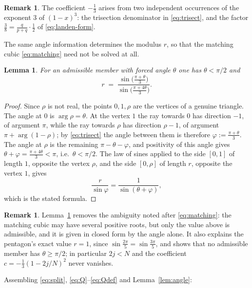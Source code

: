 \documentclass[11pt]{article}
\newtheorem{lemma}[theorem]{Lemma}
\theoremstyle{definition}
\newtheorem{remark}[theorem]{Remark}
\begin{document}
\begin{remark}
The coefficient $-\tfrac13$ arises from two independent occurrences of the exponent $3$ of $(1-x)^3$:
the trisection denominator in \eqref{eq:trisect}, and the factor
$\tfrac38=\tfrac{q}{p+q}\cdot\tfrac12$ of \eqref{eq:landen-form}.
\end{remark}

The same angle information determines the modulus $r$, so that the matching cubic
\eqref{eq:matching} need not be solved at all.

\begin{lemma}\label{lem:modulus}
For an admissible member with forced angle $\theta$ one has $\theta<\pi/2$ and
\[
  r\;=\;\frac{\sin\!\big(\tfrac{\pi+\theta}{3}\big)}{\sin\!\big(\tfrac{\pi+4\theta}{3}\big)} .
\]
\end{lemma}

\begin{proof}
Since $\rho$ is not real, the points $0,1,\rho$ are the vertices of a genuine triangle. The angle at
$0$ is $\arg\rho=\theta$. At the vertex $1$ the ray towards $0$ has direction $-1$, of argument $\pi$,
while the ray towards $\rho$ has direction $\rho-1$, of argument $\pi+\arg(1-\rho)$; by
\eqref{eq:trisect} the angle between them is therefore $\varphi:=\tfrac{\pi+\theta}{3}$. The angle at
$\rho$ is the remaining $\pi-\theta-\varphi$, and positivity of this angle gives
$\theta+\varphi=\tfrac{\pi+4\theta}{3}<\pi$, i.e.\ $\theta<\pi/2$. The law of sines applied to the
side $[0,1]$ of length $1$, opposite the vertex $\rho$, and the side $[0,\rho]$ of length $r$,
opposite the vertex $1$, gives
\[
  \frac{r}{\sin\varphi}=\frac{1}{\sin(\theta+\varphi)},
\]
which is the stated formula. \qedhere
\end{proof}

\begin{remark}
Lemma~\ref{lem:modulus} removes the ambiguity noted after \eqref{eq:matching}: the matching cubic may
have several positive roots, but only the value above is admissible, and it is given in closed form
by the angle alone. It also explains the pentagon's exact value $r=1$, since
$\sin\tfrac{2\pi}{5}=\sin\tfrac{3\pi}{5}$, and shows that no admissible member has $\theta\ge\pi/2$;
in particular $2j<N$ and the coefficient $c=-\tfrac13(1-2j/N)^2$ never vanishes.
\end{remark}

Assembling \eqref{eq:split}, \eqref{eq:Q}--\eqref{eq:Qdef} and Lemma~\ref{lem:angle}:
\end{document}
